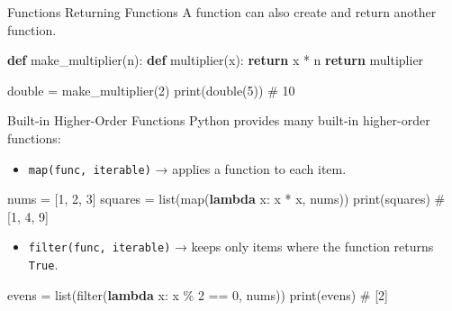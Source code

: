 \documentclass[
  letterpaper,
  DIV=11,
  numbers=noendperiod]{scrreprt}
\newenvironment{Shaded}{\begin{snugshade}}{\end{snugshade}}
\newcommand{\BuiltInTok}[1]{\textcolor[rgb]{0.00,0.23,0.31}{#1}}
\newcommand{\CommentTok}[1]{\textcolor[rgb]{0.37,0.37,0.37}{#1}}
\newcommand{\ControlFlowTok}[1]{\textcolor[rgb]{0.00,0.23,0.31}{\textbf{#1}}}
\newcommand{\DecValTok}[1]{\textcolor[rgb]{0.68,0.00,0.00}{#1}}
\newcommand{\KeywordTok}[1]{\textcolor[rgb]{0.00,0.23,0.31}{\textbf{#1}}}
\newcommand{\NormalTok}[1]{\textcolor[rgb]{0.00,0.23,0.31}{#1}}
\newcommand{\OperatorTok}[1]{\textcolor[rgb]{0.37,0.37,0.37}{#1}}
\providecommand{\tightlist}{%
  \setlength{\itemsep}{0pt}\setlength{\parskip}{0pt}}
\begin{document}
Functions Returning Functions A function can also create and return
another function.

\begin{Shaded}
\begin{Highlighting}[]
\KeywordTok{def}\NormalTok{ make\_multiplier(n):}
    \KeywordTok{def}\NormalTok{ multiplier(x):}
        \ControlFlowTok{return}\NormalTok{ x }\OperatorTok{*}\NormalTok{ n}
    \ControlFlowTok{return}\NormalTok{ multiplier}

\NormalTok{double }\OperatorTok{=}\NormalTok{ make\_multiplier(}\DecValTok{2}\NormalTok{)}
\BuiltInTok{print}\NormalTok{(double(}\DecValTok{5}\NormalTok{))   }\CommentTok{\# 10}
\end{Highlighting}
\end{Shaded}

Built-in Higher-Order Functions Python provides many built-in
higher-order functions:

\begin{itemize}
\tightlist
\item
  \texttt{map(func,\ iterable)} → applies a function to each item.
\end{itemize}

\begin{Shaded}
\begin{Highlighting}[]
\NormalTok{nums }\OperatorTok{=}\NormalTok{ [}\DecValTok{1}\NormalTok{, }\DecValTok{2}\NormalTok{, }\DecValTok{3}\NormalTok{]}
\NormalTok{squares }\OperatorTok{=} \BuiltInTok{list}\NormalTok{(}\BuiltInTok{map}\NormalTok{(}\KeywordTok{lambda}\NormalTok{ x: x }\OperatorTok{*}\NormalTok{ x, nums))}
\BuiltInTok{print}\NormalTok{(squares)   }\CommentTok{\# [1, 4, 9]}
\end{Highlighting}
\end{Shaded}

\begin{itemize}
\tightlist
\item
  \texttt{filter(func,\ iterable)} → keeps only items where the function
  returns \texttt{True}.
\end{itemize}

\begin{Shaded}
\begin{Highlighting}[]
\NormalTok{evens }\OperatorTok{=} \BuiltInTok{list}\NormalTok{(}\BuiltInTok{filter}\NormalTok{(}\KeywordTok{lambda}\NormalTok{ x: x }\OperatorTok{\%} \DecValTok{2} \OperatorTok{==} \DecValTok{0}\NormalTok{, nums))}
\BuiltInTok{print}\NormalTok{(evens)   }\CommentTok{\# [2]}
\end{Highlighting}
\end{Shaded}
\end{document}
